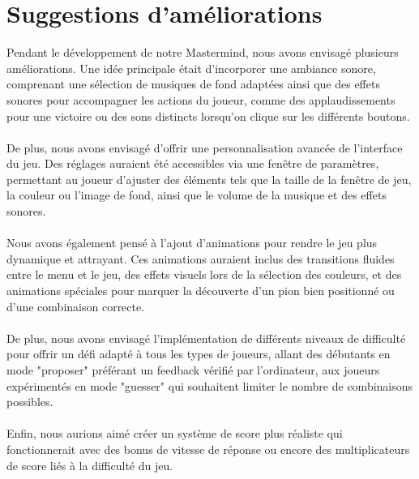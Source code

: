 
\section{Suggestions d'améliorations}

Pendant le développement de notre Mastermind, nous avons envisagé plusieurs améliorations. Une idée principale était d'incorporer une ambiance sonore, comprenant une sélection de musiques de fond adaptées ainsi que des effets sonores pour accompagner les actions du joueur, comme des applaudissements pour une victoire ou des sons distincts lorsqu'on clique sur les différents boutons.
\\\\
De plus, nous avons envisagé d'offrir une personnalisation avancée de l'interface du jeu. Des réglages auraient été accessibles via une fenêtre de paramètres, permettant au joueur d'ajuster des éléments tels que la taille de la fenêtre de jeu, la couleur ou l'image de fond, ainsi que le volume de la musique et des effets sonores.
\\\\
Nous avons également pensé à l'ajout d'animations pour rendre le jeu plus dynamique et attrayant. Ces animations auraient inclus des transitions fluides entre le menu et le jeu, des effets visuels lors de la sélection des couleurs, et des animations spéciales pour marquer la découverte d'un pion bien positionné ou d'une combinaison correcte.
\\\\
De plus, nous avons envisagé l'implémentation de différents niveaux de difficulté pour offrir un défi adapté à tous les types de joueurs, allant des débutants en mode "proposer" préférant un feedback vérifié par l'ordinateur, aux joueurs expérimentés en mode "guesser" qui souhaitent limiter le nombre de combinaisons possibles.
\\\\
Enfin, nous aurions aimé créer un système de score plus réaliste qui fonctionnerait avec des bonus de vitesse de réponse ou encore des multiplicateurs de score liés à la difficulté du jeu. 